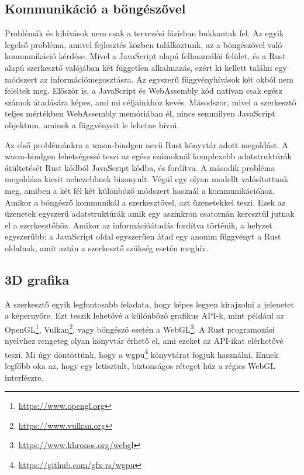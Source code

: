 \subsection{Kommunikáció a böngészővel}

Problémák és kihívások nem csak a tervezési fázisban bukkantak fel. Az egyik legelső probléma,
amivel fejlesztés közben találkoztunk, az a böngészővel való kommunikáció kérdése. Mivel a
JavaScript alapú felhasználói felület, és a Rust alapú szerkesztő valójában két független
alkalmazás, ezért ki kellett találni egy módszert az információmegosztásra. Az egyszerű
függvényhívások két okból nem feleltek meg. Először is, a JavaScript és WebAssembly kód natívan
csak egész számok átadására képes, ami mi céljainkhoz kevés. Másodszor, mivel a szerkesztő teljes
mértékben WebAssembly memóriában él, nincs semmilyen JavaScript objektum, aminek a függvényeit le
lehetne hívni.

Az első problémánkra a wasm-bindgen nevű Rust könyvtár adott megoldást. A wasm-bindgen lehetségessé
teszi az egész számoknál komplexebb adatstruktúrák átültetését Rust kódból JavaScript kódba, és
fordítva. A második probléma megoldása kicsit nehezebbnek bizonyult. Végül egy olyan
modellt valósítottunk meg, amiben a két fél két különböző módszert használ a kommunikációhoz.
Amikor a böngésző kommunikál a szerkesztővel, azt üzenetekkel teszi. Ezek az üzenetek egyszerű
adatstruktúrák amik egy aszinkron csatornán keresztül jutnak el a szerkesztőhöz. Amikor az
információátadás fordítva történik, a helyzet egyszerűbb: a JavaScript oldal egyszerűen átad egy
anonim függvényt a Rust oldalnak, amit aztán a szerkesztő szükség esetén meghív.

\subsection{3D grafika}

A szerkesztő egyik legfontosabb feladata, hogy képes legyen kirajzolni a jelenetet a képernyőre.
Ezt teszik lehetővé a különböző grafikus API-k, mint például az
OpenGL\footnote{\url{https://www.opengl.org}}, Vulkan\footnote{\url{https://www.vulkan.org}},
vagy böngésző esetén a WebGL\footnote{\url{https://www.khronos.org/webgl}}.
A Rust programozási nyelvhez rengeteg olyan könyvtár érhető el, ami ezeket az API-ikat elérhetővé
teszi. Mi úgy döntöttünk, hogy a wgpu\footnote{\url{https://github.com/gfx-rs/wgpu}} könyvtárat fogjuk
használni. Ennek legfőbb oka az, hogy egy letisztult, biztonságos réteget húz a régies WebGL
interfészre.

